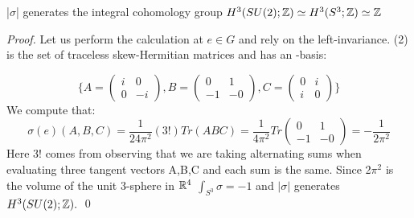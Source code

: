 \begin{lemma} |$\sigma$| generates the integral cohomology group $H^3(SU(2);\mathbb{Z}) \simeq H^3(S^3;\mathbb{Z}) \simeq \mathbb{Z}$
\begin{proof}
 Let us perform the calculation at $e \in G$ and rely on the left-invariance. \su (2) is the set of traceless
 skew-Hermitian matrices and has an \Rbb-basis:

 \begin{equation*}
\{
   A = \left( \begin{matrix}                                                      i& 0 \\
                                                                      0 & -i \end{matrix} \right), B = \left( 
                                                                      \begin{matrix}       0& 1\\
                                                                      -1 & -0 
                                                                      \end{matrix} \right), 
                                                                    C =  \left( \begin{matrix}         0& i \\
                                                                      i & 0 \end{matrix} \right) \}
 \end{equation*}
 We compute that:
 \begin{equation*}
  \sigma(e)(A,B,C) = \dfrac{1}{24\pi^{2}}(3!)Tr(ABC) = \dfrac{1}{4\pi^{2}} Tr \left( \begin{matrix}                       0& 1\\
                                                                      -1 & -0 \end{matrix} \right)  = - \dfrac{1}{2\pi^{2}}
 \end{equation*}
Here 3! comes from observing that we are taking alternating sums when evaluating three tangent vectors A,B,C and each sum is the same.
Since 2$\pi^{2}$ is the volume of the unit 3-sphere in $\mathbb{R}^{4}$ $\int_{S^{3}} \sigma = -1$ and
$|\sigma|$ generates $H^{3}(SU(2);\mathbb{Z}).$
\qed
\end{proof}

 
\end{lemma}
